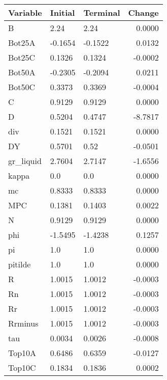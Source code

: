 \begin{table}
\centering
\label{tab:stst_comparison_low_B_limit_permanent}
\begin{tabular}{lllr}
\toprule
                Variable & Initial & Terminal &  Change \\
\midrule
                       B &    2.24 &     2.24 &  0.0000 \\
                  Bot25A & -0.1654 &  -0.1522 &  0.0132 \\
                  Bot25C &  0.1326 &   0.1324 & -0.0002 \\
                  Bot50A & -0.2305 &  -0.2094 &  0.0211 \\
                  Bot50C &  0.3373 &   0.3369 & -0.0004 \\
                       C &  0.9129 &   0.9129 &  0.0000 \\
                       D &  0.5204 &   0.4747 & -8.7817 \\
                     div &  0.1521 &   0.1521 &  0.0000 \\
                      DY &  0.5701 &     0.52 & -0.0501 \\
               gr\_liquid &  2.7604 &   2.7147 & -1.6556 \\
                   kappa &     0.0 &      0.0 &  0.0000 \\
                      mc &  0.8333 &   0.8333 &  0.0000 \\
                     MPC &  0.1381 &   0.1403 &  0.0022 \\
                       N &  0.9129 &   0.9129 &  0.0000 \\
                     phi & -1.5495 &  -1.4238 &  0.1257 \\
                      pi &     1.0 &      1.0 &  0.0000 \\
                 pitilde &     1.0 &      1.0 &  0.0000 \\
                       R &  1.0015 &   1.0012 & -0.0003 \\
                      Rn &  1.0015 &   1.0012 & -0.0003 \\
                      Rr &  1.0015 &   1.0012 & -0.0003 \\
                 Rrminus &  1.0015 &   1.0012 & -0.0003 \\
                     tau &  0.0034 &   0.0026 & -0.0008 \\
                  Top10A &  0.6486 &   0.6359 & -0.0127 \\
                  Top10C &  0.1834 &   0.1836 &  0.0002 \\

\end{tabular}
\end{table}
